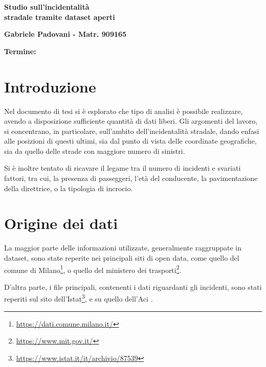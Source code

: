 \documentclass[a4paper]{article}
\begin{document}
    \begin{center}
    {\huge{\bf Studio sull'incidentalità}}\\
    \vspace{3mm}
    {\huge{\bf stradale tramite dataset aperti}}\\
    \end{center}
    \vspace{3mm}
    \begin{center}
    {\bf Gabriele Padovani - Matr. 909165}\\
    \end{center}
    \vspace{2mm}
    \begin{center}
    {\bf Termine:}\\
    \end{center}

\section{Introduzione}

Nel documento di tesi si è esplorato che tipo di analisi è possibile realizzare, 
avendo a disposizione sufficiente quantità di dati liberi. 
Gli argomenti del lavoro, si concentrano, in particolare, sull'ambito dell'incidentalità 
stradale, dando enfasi alle posizioni di questi ultimi, sia dal punto di vista delle coordinate 
geografiche, sia da quello delle strade con maggiore numero di sinistri. 

Si è inoltre tentato di ricavare il legame tra il numero di incidenti e svariati fattori, 
tra cui, la presenza di passeggeri, l'età del conducente, la pavimentazione della direttrice, 
o la tipologia di incrocio.

\section{Origine dei dati}

La maggior parte delle informazioni utilizzate, generalmente raggruppate in dataset, sono 
state reperite nei principali siti di open data, come quello del comune di 
Milano\footnote{\url{https://dati.comune.milano.it/}}, o 
quello del ministero dei trasporti\footnote{\url{https://www.mit.gov.it/}}.

D'altra parte, i file principali, contenenti i dati riguardanti gli incidenti, sono 
stati reperiti sul sito 
dell'Istat\footnote{\url{https://www.istat.it/it/archivio/87539}}, e su quello 
dell'Aci \cite{ACI:1}.
\end{document}
